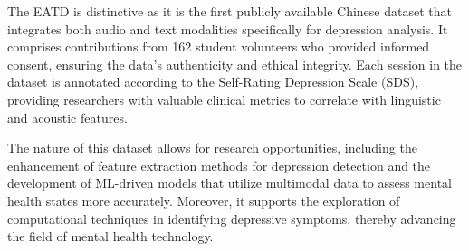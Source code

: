 The EATD is distinctive as it is the first publicly available Chinese dataset that integrates both audio and text modalities specifically for depression analysis. It comprises contributions from 162 student volunteers who provided informed consent, ensuring the data's authenticity and ethical integrity. Each session in the dataset is annotated according to the Self-Rating Depression Scale (SDS)\cite{SDS}, providing researchers with valuable clinical metrics to correlate with linguistic and acoustic features.

The nature of this dataset allows for research opportunities, including the enhancement of feature extraction methods for depression detection and the development of ML-driven models that utilize multimodal data to assess mental health states more accurately. Moreover, it supports the exploration of computational techniques in identifying depressive symptoms, thereby advancing the field of mental health technology.

